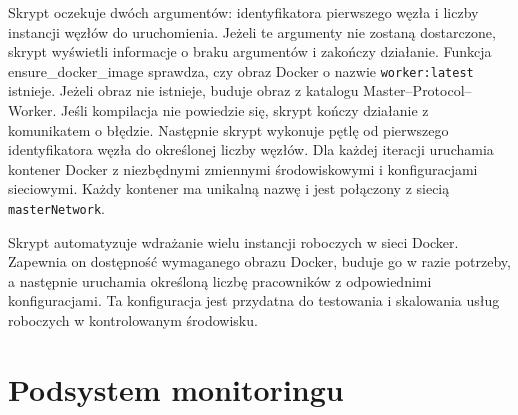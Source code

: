 Skrypt oczekuje dwóch argumentów: identyfikatora pierwszego węzła i liczby instancji węzłów do uruchomienia. Jeżeli te argumenty nie zostaną dostarczone, skrypt wyświetli informacje o braku argumentów i zakończy działanie. Funkcja ensure\_docker\_image sprawdza, czy obraz Docker o nazwie \verb|worker:latest| istnieje. Jeżeli obraz nie istnieje, buduje obraz z katalogu Master--Protocol--Worker. Jeśli kompilacja nie powiedzie się, skrypt kończy działanie z komunikatem o błędzie. Następnie skrypt wykonuje pętlę od pierwszego identyfikatora węzła do określonej liczby węzłów. Dla każdej iteracji uruchamia kontener Docker z niezbędnymi zmiennymi środowiskowymi i konfiguracjami sieciowymi. Każdy kontener ma unikalną nazwę i jest połączony z siecią \verb|masterNetwork|.

Skrypt automatyzuje wdrażanie wielu instancji roboczych w sieci Docker. Zapewnia on dostępność wymaganego obrazu Docker, buduje go w razie potrzeby, a następnie uruchamia określoną liczbę pracowników z odpowiednimi konfiguracjami. Ta konfiguracja jest przydatna do testowania i skalowania usług roboczych w kontrolowanym środowisku.


\section{Podsystem monitoringu}

